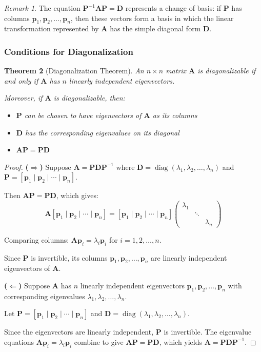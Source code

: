 \documentclass[12pt]{article}
\numberwithin{equation}{section}
\newcommand{\vect}[1]{\boldsymbol{#1}}   %
\newcommand{\mat}[1]{\mathbf{#1}}        %
\newcommand{\diag}{\operatorname{diag}}
\theoremstyle{plain}
\newtheorem{theorem}{Theorem}[section]
\theoremstyle{definition}
\theoremstyle{remark}
\newtheorem{remark}[theorem]{Remark}
\begin{document}
\begin{remark}
The equation $\mat{P}^{-1}\mat{A}\mat{P} = \mat{D}$ represents a change of basis: if $\mat{P}$ has columns $\vect{p}_1, \vect{p}_2, \ldots, \vect{p}_n$, then these vectors form a basis in which the linear transformation represented by $\mat{A}$ has the simple diagonal form $\mat{D}$.
\end{remark}

\subsubsection{Conditions for Diagonalization}

\begin{theorem}[Diagonalization Theorem]
An $n \times n$ matrix $\mat{A}$ is diagonalizable if and only if $\mat{A}$ has $n$ linearly independent eigenvectors.

Moreover, if $\mat{A}$ is diagonalizable, then:
\begin{itemize}
\item $\mat{P}$ can be chosen to have eigenvectors of $\mat{A}$ as its columns
\item $\mat{D}$ has the corresponding eigenvalues on its diagonal
\item $\mat{A}\mat{P} = \mat{P}\mat{D}$
\end{itemize}
\end{theorem}

\begin{proof}
\textbf{($\Rightarrow$)} Suppose $\mat{A} = \mat{P}\mat{D}\mat{P}^{-1}$ where $\mat{D} = \diag(\lambda_1, \lambda_2, \ldots, \lambda_n)$ and $\mat{P} = [\vect{p}_1 \mid \vect{p}_2 \mid \cdots \mid \vect{p}_n]$.

Then $\mat{A}\mat{P} = \mat{P}\mat{D}$, which gives:
$$\mat{A}[\vect{p}_1 \mid \vect{p}_2 \mid \cdots \mid \vect{p}_n] = [\vect{p}_1 \mid \vect{p}_2 \mid \cdots \mid \vect{p}_n]\begin{pmatrix} \lambda_1 & & \\ & \ddots & \\ & & \lambda_n \end{pmatrix}$$

Comparing columns: $\mat{A}\vect{p}_i = \lambda_i\vect{p}_i$ for $i = 1, 2, \ldots, n$.

Since $\mat{P}$ is invertible, its columns $\vect{p}_1, \vect{p}_2, \ldots, \vect{p}_n$ are linearly independent eigenvectors of $\mat{A}$.

\textbf{($\Leftarrow$)} Suppose $\mat{A}$ has $n$ linearly independent eigenvectors $\vect{p}_1, \vect{p}_2, \ldots, \vect{p}_n$ with corresponding eigenvalues $\lambda_1, \lambda_2, \ldots, \lambda_n$.

Let $\mat{P} = [\vect{p}_1 \mid \vect{p}_2 \mid \cdots \mid \vect{p}_n]$ and $\mat{D} = \diag(\lambda_1, \lambda_2, \ldots, \lambda_n)$.

Since the eigenvectors are linearly independent, $\mat{P}$ is invertible. The eigenvalue equations $\mat{A}\vect{p}_i = \lambda_i\vect{p}_i$ combine to give $\mat{A}\mat{P} = \mat{P}\mat{D}$, which yields $\mat{A} = \mat{P}\mat{D}\mat{P}^{-1}$.
\end{proof}
\end{document}
